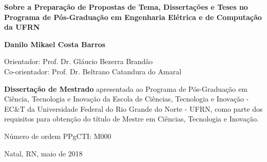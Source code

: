 \begin{titlepage}
\begin{center}
\vfill

\LARGE

\textbf{Sobre a Preparação de Propostas de Tema, Dissertações
e Teses no Programa de Pós-Graduação em Engenharia Elétrica e de Computação da UFRN}

\vfill

\Large

\textbf{Danilo Mikael Costa Barros}

\vfill

\normalsize

Orientador: Prof. Dr. Gláucio Bezerra Brandão
\\[2ex] Co-orientador: Prof. Dr. Beltrano Catandura do Amaral

\vfill

\hfill
\parbox{0.5\linewidth}{\textbf{%
Dissertação de Mestrado}
apresentada ao Programa de Pós-Graduação em Ciência, Tecnologia e Inovação da Escola de Ciências, Tecnologia e Inovação - EC\&T da Universidade Federal do Rio Grande do Norte - UFRN,
como parte dos requisitos para obtenção do título de Mestre em Ciências, Tecnologia e Inovação.}

\vfill

\large

Número de ordem PPgCTI: M000

Natal, RN, maio de 2018

\end{center}

\end{titlepage}
